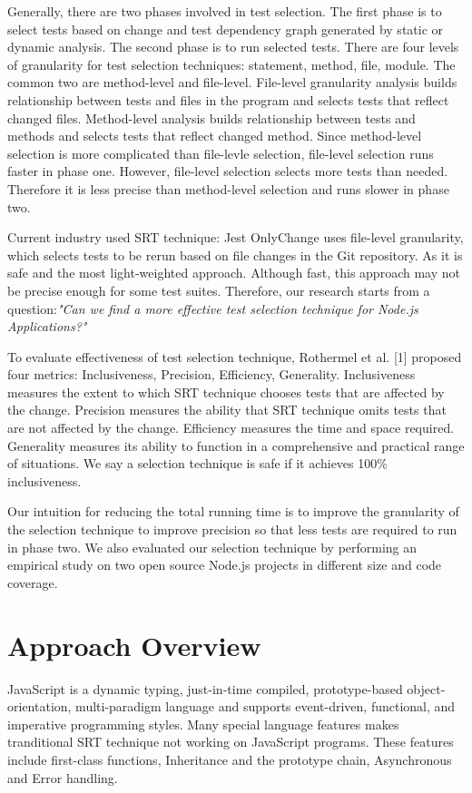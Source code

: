 \documentclass[10pt, conference]{IEEEtran}
\begin{document}
Generally, there are two phases involved in test selection. The first phase is to select tests based on change and 
test dependency graph generated by static or dynamic analysis. The second phase is to run selected tests.
There are four levels of granularity for test selection techniques: statement, method, file, module. The common 
two are method-level and file-level. File-level granularity analysis builds relationship between tests and files in 
the program and selects tests that reflect changed files. Method-level analysis builds relationship between tests and methods 
and selects tests that reflect changed method. Since method-level selection is more complicated than 
file-levle selection, file-level selection runs faster in phase one. However, file-level selection selects more 
tests than needed. Therefore it is less precise than method-level selection and runs slower in phase two. 

Current industry used SRT technique: Jest OnlyChange uses file-level granularity, which selects 
tests to be rerun based on file changes in the Git repository. As it is safe and the most light-weighted approach. Although fast, this approach may not be precise 
enough for some test suites. Therefore, our research starts from a question:\textit{"Can we find a more 
effective test selection technique for Node.js Applications?"} 

To evaluate effectiveness of test selection technique, Rothermel et al. [1] proposed four metrics: Inclusiveness, Precision, Efficiency, Generality. Inclusiveness 
measures the extent to which SRT technique chooses tests that are affected by the change. Precision measures 
the ability that SRT technique omits tests that are not affected by the change. Efficiency measures the time and 
space required. Generality measures its ability to function in a comprehensive and practical range of situations.
We say a selection technique is safe if it achieves 100\% inclusiveness.

Our intuition for reducing the total running time is to 
improve the granularity of the selection technique to improve precision so that less tests are required to run in phase two. 
We also evaluated our selection technique by performing an empirical study on two open source Node.js projects in different 
size and code coverage.

\section{Approach Overview}
JavaScript is a dynamic typing, just-in-time compiled, prototype-based object-orientation, multi-paradigm language and supports
event-driven, functional, and imperative programming styles. Many special language features makes tranditional SRT technique
not working on JavaScript programs. These features include first-class functions, Inheritance and the prototype chain, Asynchronous and Error handling. 
\end{document}
